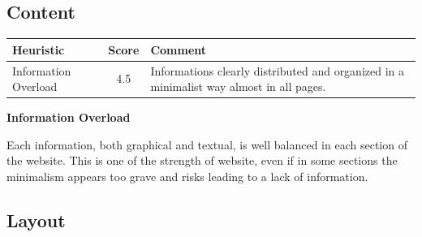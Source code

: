 \subsection{Content}
\begin{table}[H]
  \begin{center}
    \label{tab:table1}
    \begin{tabular}{||l|c|p{8cm}||} %
      \textbf{Heuristic} & \textbf{Score} & \textbf{Comment}\\
      
      \hline
     Information Overload & 4.5 & Informations clearly distributed and organized in a minimalist way almost in all pages.\\
     
    \end{tabular}
  \end{center}
\end{table}
\medskip
\textbf{Information Overload}\par
Each information, both graphical and textual, is well balanced in each section of the website. This is one of the strength of website, even if in some sections the minimalism appears too grave and risks leading to a lack of information.

\subsection{Layout}
\label{Layout}

